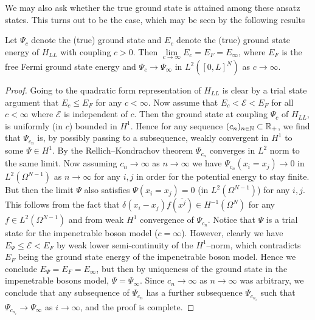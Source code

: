 	We may also ask whether the true ground state is attained among these ansatz states. This turns out to be the case, which may be seen by the following results
	\begin{lemma}\label{LemmaLLTrueGroundState}
		Let $ \Psi_c $ denote the (true) ground state and $ E_c $ denote the (true) ground state energy of $ H_{LL} $ with coupling $ c>0 $. Then $ \lim\limits_{c\to\infty}E_c=E_F=E_\infty $, where $ E_F $ is the free Fermi ground state energy and $ \Psi_c\to \Psi_{\infty} $ in $ L^2([0,L]^N) $ as $ c \to\infty $.
	\end{lemma}
	\begin{proof}
		Going to the quadratic form representation of $ H_{LL} $ is clear by a trial state argument that $ E_c\leq E_F $ for any $ c<\infty $. Now assume that $ E_c<\mathcal{E}<E_F $ for all $ c<\infty $ where $ \mathcal{E} $ is independent of $ c $. Then the ground state at coupling $ \Psi_c $ of $ H_{LL} $, is uniformly (in $ c $) bounded in $ H^1 $. Hence for any sequence $ (c_n)_{n\in\mathbb{N}}\subset\mathbb{R}_+ $, we find that $ \Psi_{c_n} $ is, by possibly passing to a subsequence, weakly convergent in $ H^1 $ to some $ \Psi\in H^1 $. By the Rellich--Kondrachov theorem $ \Psi_{c_n} $ converges in $ L^2 $ norm to the same limit. Now assuming $ c_n\to\infty $ as $ n\to\infty $ we have $ \Psi_{c_n}(x_i=x_j)\to 0 $ in $ L^2(\Omega^{N-1}) $ as $ n\to\infty $ for any $ i,j $ in order for the potential energy to stay finite. But then the limit $ \Psi $ also satisfies $ \Psi(x_i=x_j)=0 $ (in $ L^2(\Omega^{N-1}) $) for any $ i,j $. This follows from the fact that $ \delta(x_i-x_j)f(\overline{x^j})\in H^{-1}(\Omega^{N}) $ for any $ f\in L^2(\Omega^{N-1}) $ and from weak $ H^1 $ convergence of $ \Psi_{c_n} $. Notice that $ \Psi $ is a trial state for the impenetrable boson model ($ c=\infty $). However, clearly we have $ E_\Psi\leq \mathcal{E}<E_F $ by weak lower semi-continuity of the $ H^1 $--norm, which contradicts $ E_F $ being the ground state energy of the impenetrable boson model. Hence we conclude $ E_\Psi=E_F=E_\infty $, but then by uniqueness of the ground state in the impenetrable bosons model, $ \Psi=\Psi_\infty $. Since $ c_n\to \infty $ as $ n\to\infty $ was arbitrary, we conclude that any subsequence of $ \Psi_{c_n} $ has a further subsequence $ \Psi_{c_{n_i}} $ such that $ \Psi_{c_{n_i}}\to\Psi_\infty $ as $ i\to\infty $, and the proof is complete. 
	\end{proof}
